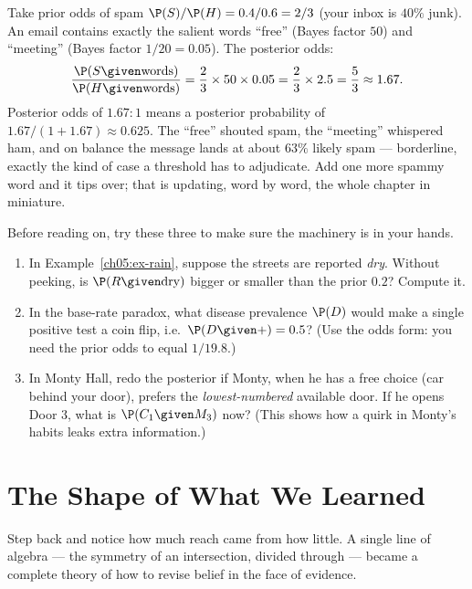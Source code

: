 \begin{example}
\label{ch05:ex-spam}
Take prior odds of spam $\P(S)/\P(H) = 0.4/0.6 = 2/3$ (your inbox is $40\%$ junk). An
email contains exactly the salient words ``free'' (Bayes factor $50$) and ``meeting''
(Bayes factor $1/20 = 0.05$). The posterior odds:
\[
  \frac{\P(S\given\text{words})}{\P(H\given\text{words})}
  = \frac23 \times 50 \times 0.05 = \frac23 \times 2.5 = \frac{5}{3} \approx 1.67.
\]
Posterior odds of $1.67{:}1$ means a posterior probability of
$1.67/(1+1.67)\approx 0.625$. The ``free'' shouted spam, the ``meeting'' whispered ham,
and on balance the message lands at about $63\%$ likely spam --- borderline, exactly the
kind of case a threshold has to adjudicate. Add one more spammy word and it tips over;
that is updating, word by word, the whole chapter in miniature.
\end{example}

\begin{labbox}
Before reading on, try these three to make sure the machinery is in your hands.
\begin{enumerate}
\item In Example~\ref{ch05:ex-rain}, suppose the streets are reported \emph{dry}. Without
peeking, is $\P(R \given \text{dry})$ bigger or smaller than the prior $0.2$? Compute it.
\item In the base-rate paradox, what disease prevalence $\P(D)$ would make a single
positive test a coin flip, i.e.\ $\P(D\given +)=0.5$? (Use the odds form: you need the
prior odds to equal $1/19.8$.)
\item In Monty Hall, redo the posterior if Monty, when he has a free choice (car behind
your door), prefers the \emph{lowest-numbered} available door. If he opens Door $3$, what
is $\P(C_1\given M_3)$ now? (This shows how a quirk in Monty's habits leaks extra
information.)
\end{enumerate}
\end{labbox}

\section{The Shape of What We Learned}
\label{ch05:summary}

Step back and notice how much reach came from how little. A single line of algebra ---
the symmetry of an intersection, divided through --- became a complete theory of how to
revise belief in the face of evidence.

